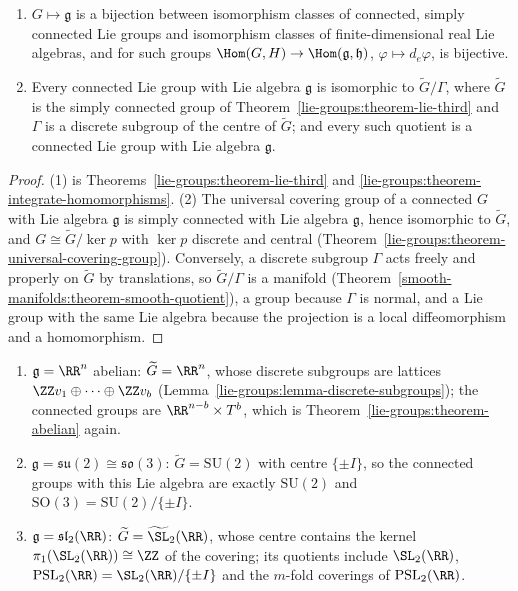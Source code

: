 \begin{corollary}\label{lie-groups:corollary-lie-correspondence}
\begin{enumerate}
\item $G \mapsto \mathfrak{g}$ is a bijection between isomorphism classes of connected, simply connected Lie groups and isomorphism classes of finite-dimensional real Lie
algebras, and for such groups $\Hom(G, H) \to \Hom(\mathfrak{g}, \mathfrak{h})$, $\varphi \mapsto d_e\varphi$, is bijective.
\item Every connected Lie group with Lie algebra $\mathfrak{g}$ is isomorphic to $\widetilde{G}/\Gamma$, where $\widetilde{G}$ is the simply connected group of
Theorem~\ref{lie-groups:theorem-lie-third} and $\Gamma$ is a discrete subgroup of the centre of $\widetilde{G}$; and every such quotient is a connected Lie group with
Lie algebra $\mathfrak{g}$.
\end{enumerate}
\end{corollary}

\begin{proof}
(1) is Theorems~\ref{lie-groups:theorem-lie-third} and \ref{lie-groups:theorem-integrate-homomorphisms}. (2) The universal covering group of a connected $G$ with Lie
algebra $\mathfrak{g}$ is simply connected with Lie algebra $\mathfrak{g}$, hence isomorphic to $\widetilde{G}$, and $G \cong \widetilde{G}/\ker p$ with $\ker p$ discrete and
central (Theorem~\ref{lie-groups:theorem-universal-covering-group}). Conversely, a discrete subgroup $\Gamma$ acts freely and properly on $\widetilde{G}$ by
translations, so $\widetilde{G}/\Gamma$ is a manifold (Theorem~\ref{smooth-manifolds:theorem-smooth-quotient}), a group because $\Gamma$ is normal, and a Lie group with
the same Lie algebra because the projection is a local diffeomorphism and a homomorphism.
\end{proof}

\begin{example}\label{lie-groups:example-lie-correspondence}
\begin{enumerate}
\item $\mathfrak{g} = \RR^n$ abelian: $\widetilde{G} = \RR^n$, whose discrete subgroups are lattices $\ZZ v_1 \oplus \cdots \oplus \ZZ v_b$ (Lemma~\ref{lie-groups:lemma-discrete-subgroups}); the
connected groups are $\RR^{n-b} \times T^b$, which is Theorem~\ref{lie-groups:theorem-abelian} again.
\item $\mathfrak{g} = \mathfrak{su}(2) \cong \mathfrak{so}(3)$: $\widetilde{G} = \mathrm{SU}(2)$ with centre $\{\pm I\}$, so the connected groups with this Lie algebra are exactly
$\mathrm{SU}(2)$ and $\mathrm{SO}(3) = \mathrm{SU}(2)/\{\pm I\}$.
\item $\mathfrak{g} = \mathfrak{sl}_2(\RR)$: $\widetilde{G} = \widetilde{\SL}_2(\RR)$, whose centre contains the kernel $\pi_1(\SL_2(\RR)) \cong \ZZ$ of the covering; its quotients include
$\SL_2(\RR)$, $\mathrm{PSL}_2(\RR) = \SL_2(\RR)/\{\pm I\}$ and the $m$-fold coverings of $\mathrm{PSL}_2(\RR)$.
\end{enumerate}
\end{example}

